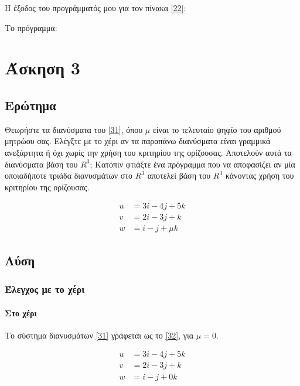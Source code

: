 \documentclass[12pt, fleqn, leqno]{extreport}
\begin{document}
Η έξοδος του προγράμματός μου για τον πίνακα \eqref{22}:


Το πρόγραμμα:



\chapter{Άσκηση 3}
\section{Ερώτημα}

Θεωρήστε τα διανύσματα του \eqref{31}, όπου $\mu$ είναι το τελευταίο ψηφίο του αριθμού μητρώου σας. Ελέγξτε με το χέρι αν τα παραπάνω διανύσματα είναι γραμμικά ανεξάρτητα ή όχι χωρίς την χρήση του κριτηρίου της ορίζουσας. Αποτελούν αυτά τα διανύσματα βάση του $R^{3}$; Κατόπιν φτιάξτε ένα πρόγραμμα που να αποφασίζει αν μία οποιαδήποτε τριάδα διανυσμάτων στο $R^{3}$ αποτελεί βάση του $R^{3}$ κάνοντας χρήση του κριτηρίου της ορίζουσας.

\begin{equation}%
    \begin{aligned}
        u & = 3i - 4j + 5k  \\
        v & = 2i - 3j + k   \\
        w & = i - j + \mu k
    \end{aligned}\label{31}
\end{equation}

\newpage
\section{Λύση}

\subsection{Έλεγχος με το χέρι}
\subsubsection{Στο χέρι}

Το σύστημα διανυσμάτων \eqref{31} γράφεται ως το \eqref{32}, για $\mu = 0$.

\begin{equation}%
    \begin{aligned}
        u & = 3i - 4j + 5k \\
        v & = 2i - 3j + k  \\
        w & = i - j + 0k
    \end{aligned}\label{32}
\end{equation}
\end{document}
